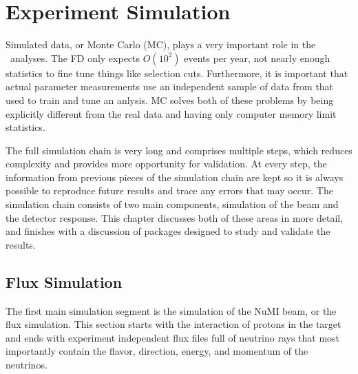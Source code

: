 \chapter{Experiment Simulation}
\label{ch:Simulation}

Simulated data, or Monte Carlo (MC), plays a very important role in the \nova~analyses. The FD only expects $O(10^2)$ events per year, not nearly enough statistics to fine tune things like selection cuts. Furthermore, it is important that actual parameter measurements use an independent sample of data from that used to train and tune an anlysis. MC solves both of these problems by being explicitly different from the real data and having only computer memory limit statistics.

The full simulation chain is very long and comprises multiple steps, which reduces complexity and provides more opportunity for validation. At every step, the information from previous pieces of the simulation chain are kept so it is always possible to reproduce future results and trace any errors that may occur. The simulation chain consists of two main components, simulation of the beam and the detector response. This chapter discusses both of these areas in more detail, and finishes with a discussion of packages designed to study and validate the results.

\section{Flux Simulation}
\label{sec:SimFlux}

The first main simulation segment is the simulation of the NuMI beam, or the flux simulation. This section starts with the interaction of protons in the target and ends with experiment independent flux files full of neutrino rays that most importantly contain the flavor, direction, energy, and momentum of the neutrinos.


